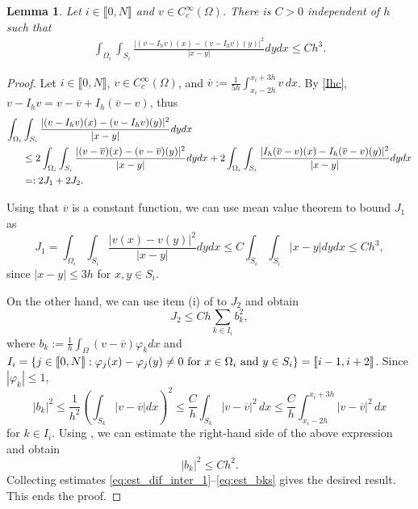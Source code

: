 \documentclass[11 pt]{article}
\newcommand\inter[1]{\llbracket #1\rrbracket}
\newtheorem{lemma}[theorem]{Lemma}
\numberwithin{equation}{section}
\begin{document}
\begin{lemma}\label{lem:stab_dif_interp}
Let $i\in\inter{0,N}$ and $v\in C_c^\infty(\Omega)$. There is $C>0$ independent of $h$ such that
\begin{align}\label{eq:approxim_estimate}
    \int_{\Omega_i}\int_{S_i}\frac{|(v-I_h v)(x)-(v-I_h v)(y)|^2}{|x-y|}dy dx \leq C h^3. 
\end{align}
\end{lemma}
%
\begin{proof}
Let $i\in\inter{0,N}$, $v\in C_c^\infty(\Omega)$, and $\overline {v}:=\frac{1}{5h}\int_{x_i-2h}^{x_i+3h}v\,dx$.
By \eqref{Ihc}, $v-I_h v=v-\overline{v}+I_h(\overline v - v)$, thus
%
\begin{align}\notag
    \int_{\Omega_i}&\int_{S_i}\frac{|(v-I_h v)(x)-(v-I_h v)(y)|^2}{|x-y|} dy dx \\ \notag
    &\leq 2\int_{\Omega_i}\int_{S_i}\frac{|(v-\overline{v})(x)-(v-\overline{v})(y)|^2}{|x-y|}dy dx + 2 \int_{\Omega_i}\int_{S_i}\frac{|I_h(\overline v-{v})(x)-I_h(\overline v-{v})(y)|^2}{|x-y|}dy dx \\ \label{eq:est_dif_inter_1}
    &=:2J_1+2J_2.
\end{align}
%

Using that $\overline v$ is a constant function, we can use mean value theorem to bound $J_1$ as
%
\begin{equation}\label{eq:est_J1}
    J_1 = \int_{\Omega_i}\int_{S_i}\frac{|v(x)-v(y)|^2}{|x-y|}dy dx \leq C \int_{S_i}\int_{S_i}|x-y|dy dx \leq Ch^3,
\end{equation}
since $|x-y|\leq 3h$ for $x,y\in S_i$.

On the other hand, we can use item (i) of  to $J_2$ and obtain
%
\begin{equation}\label{eq:est_J2}
    J_2 \leq Ch\sum_{k\in I_i} b_k^2,
\end{equation}
%
where $b_k:=\frac{1}{h}\int_{\Omega}(v-\overline v)\varphi_k dx$ and $I_i=\{j\in\inter{0,N}:\varphi_j(x)-\varphi_j(y) \neq 0 \ \textnormal{for $x\in \Omega_i$ and $y\in S_i$}\}=\inter{i-1,i+2}$. Since $|\varphi_k|\leq 1$, 
\begin{equation}\label{abk}
    |b_k|^2
    \leq \frac{1}{h^2}\left(\int_{S_k} |v-\overline v|dx\right)^2
    \leq \frac{C}{h}\int_{S_k}|v-\overline{v}|^2\, dx
    \leq \frac{C}{h}\int_{x_i-2h}^{x_i+3h}|v-\overline{v}|^2\, dx
\end{equation}
for $k\in I_i.$ Using , we can estimate the right-hand side of the above expression and obtain
%
\begin{equation}\label{eq:est_bks}
    |b_k|^2\leq Ch^2.
\end{equation}
%
Collecting estimates \eqref{eq:est_dif_inter_1}--\eqref{eq:est_bks} gives the desired result. This ends the proof. 
\end{proof}
\end{document}
